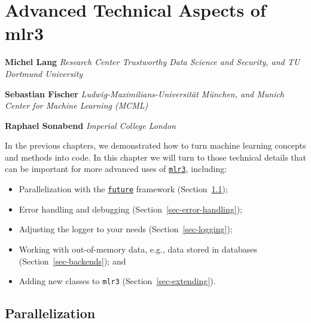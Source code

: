 \hypertarget{sec-technical}{%
\chapter{Advanced Technical Aspects of mlr3}\label{sec-technical}}

\vspace{-15mm}

\textbf{Michel Lang} \newline  \emph{Research Center Trustworthy Data
Science and Security, and TU Dortmund University}

\textbf{Sebastian Fischer} \newline 
\emph{Ludwig-Maximilians-Universität München, and Munich Center for
Machine Learning (MCML)}

\textbf{Raphael Sonabend} \newline  \emph{Imperial College London}
\newline \newline 

In the previous chapters, we demonstrated how to turn machine learning
concepts and methods into code. In this chapter we will turn to those
technical details that can be important for more advanced uses of
\href{https://mlr3.mlr-org.com}{\texttt{mlr3}},
including:

\begin{itemize}
\tightlist
\item
  Parallelization with the
  \href{https://cran.r-project.org/package=future}{\texttt{future}}
  framework (Section~\ref{sec-parallelization});
\item
  Error handling and debugging
  (Section~\ref{sec-error-handling});
\item
  Adjusting the logger to your needs (Section~\ref{sec-logging});
\item
  Working with out-of-memory data, e.g., data stored in databases
  (Section~\ref{sec-backends}); and
\item
  Adding new classes to \texttt{mlr3} (Section~\ref{sec-extending}).
\end{itemize}

\hypertarget{sec-parallelization}{%
\section{Parallelization}\label{sec-parallelization}}

